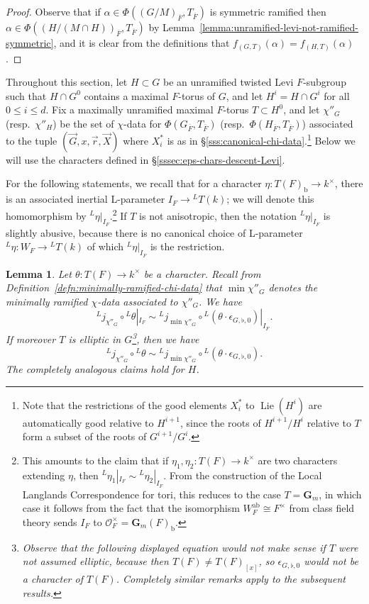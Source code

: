 \documentclass[reqno]{amsart}
\numberwithin{equation}{subsection}
\newcommand{\G}{\mathbf{G}}
\newcommand{\ol}[1]{\overline{#1}}
\newcommand{\co}{\colon}
\newcommand{\ld}{{}^L}
\newcommand\cO{\mathcal{O}}
\DeclareMathOperator{\ab}{ab}
\DeclareMathOperator{\Lie}{Lie}
\newtheorem{lemma}[thm]{Lemma}
\theoremstyle{remark}
\numberwithin{equation}{subsection}
\numberwithin{figure}{subsection}
\begin{document}
\begin{proof}
Observe that if $\alpha \in \Phi((G/M)_{\ol F},T_{\ol F})$ is symmetric ramified then $\alpha \in \Phi((H/(M \cap H))_{\ol F}, T_{\ol F})$ by Lemma~\ref{lemma:unramified-levi-not-ramified-symmetric}, and it is clear from the definitions that $f_{(G,T)}(\alpha) = f_{(H,T)}(\alpha)$.
\end{proof}

Throughout this section, let $H \subset G$ be an unramified twisted Levi $F$-subgroup such that $H \cap G^0$ contains a maximal $F$-torus of $G$, and let $H^i = H \cap G^i$ for all $0 \leq i \leq d$. Fix a maximally unramified maximal $F$-torus $T \subset H^0$, and let $\chi''_G$ (resp.\ $\chi''_H$) be the set of $\chi$-data for $\Phi(G_{\ol F}, T_{\ol F})$ (resp.\ $\Phi(H_{\ol F}, T_{\ol F})$) associated to the tuple $(\vec{G},x,\vec{r},\vec{X})$ where $X_i^*$ is as in \S \ref{sss:canonical-chi-data}.\footnote{Note that the restrictions of the good elements $X_i^*$ to $\Lie(H^i)$ are automatically good relative to $H^{i+1}$, since the roots of $H^{i+1}/H^i$ relative to $T$ form a subset of the roots of $G^{i+1}/G^i$.} Below we will use the characters defined in \S \ref{sssec:eps-chars-descent-Levi}.

For the following statements, we recall that for a character $\eta\co T(F)_{\mathrm{b}} \to k^\times$, there is an associated inertial L-parameter $I_F \to \ld T(k)$; we will denote this homomorphism by $\ld\eta|_{I_F}$.\footnote{This amounts to the claim that if $\eta_1, \eta_2\co T(F) \to k^\times$ are two characters extending $\eta$, then $\ld\eta_1|_{I_F}\sim\ld\eta_2|_{I_F}$. From the construction of the Local Langlands Correspondence for tori, this reduces to the case $T = \G_m$, in which case it follows from the fact that the isomorphism $W_F^{\ab} \cong F^\times$ from class field theory sends $I_F$ to $\cO_F^\times = \G_m(F)_{\mathrm{b}}$.} If $T$ is not anisotropic, then the notation $\ld\eta|_{I_F}$ is slightly abusive, because there is no canonical choice of L-parameter $\ld\eta\co W_F \to \ld T(k)$ of which $\ld\eta|_{I_F}$ is the restriction.

\begin{lemma}\label{lemma:comparison-to-minimal-ramified-chi-data}
Let $\theta\co T(F) \to k^\times$ be a character. Recall from Definition~\ref{defn:minimally-ramified-chi-data} that $\min \chi''_G$ denotes the minimally ramified $\chi$-data associated to $\chi''_G$. We have
\[
    \ld j_{\chi''_G} \circ \ld\theta|_{I_F} \sim \ld j_{\min \chi''_G} \circ \ld(\theta \cdot \epsilon_{G,\flat,0})|_{I_F}.
\]
If moreover $T$ is elliptic in $G$\footnote{Observe that the following displayed equation would not make sense if $T$ were not assumed elliptic, because then $T(F) \neq T(F)_{[x]}$, so $\epsilon_{G,\flat,0}$ would not be a character of $T(F)$. Completely similar remarks apply to the subsequent results.}, then we have
\[
\ld j_{\chi''_G} \circ \ld\theta \sim \ld j_{\min \chi''_G} \circ \ld(\theta \cdot \epsilon_{G,\flat,0}).
\]
The completely analogous claims hold for $H$.
\end{lemma}
\end{document}
